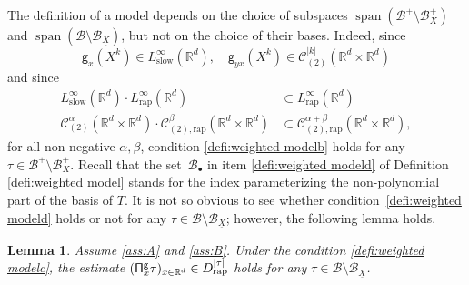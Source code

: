 \documentclass[JEP,XML,SOM,Unicode,published]{cedram}
\newcommand{\sbullet}{{\scriptscriptstyle\bullet}}
\DeclareMathOperator{\Span}{span}
\theoremstyle{plain}
\newtheorem{lem}[thm]{Lemma}
\theoremstyle{definition}
\newcommand{\rap}{\mathrm{rap}}
\newcommand{\slow}{\mathrm{slow}}
\newcommand{\sfg}{\mathsf{g}}
\newcommand{\bbR}{\mathbb{R}}
\newcommand{\mcB}{\mathcal{B}}
\newcommand{\mcC}{\mathcal{C}}
\begin{document}
The definition of a model depends on the choice of subspaces $\Span (\mcB^+\setminus\mcB_X^+)$ and $\Span (\mcB\setminus\mcB_{\underline{X}})$, but not on the choice of their bases.
Indeed, since
\[
\sfg_x(X^k)\in L_\slow^\infty(\bbR^d),\quad \sfg_{yx}(X^k)\in\mcC_{(2)}^{|k|}(\bbR^d\times\bbR^d)
\]
and since
\begin{align*}
L_\slow^\infty(\bbR^d)\cdot L_\rap^\infty(\bbR^d)&\subset L_\rap^\infty(\bbR^d)\\
\tag*{and}\mcC_{(2)}^\alpha(\bbR^d\times\bbR^d)\cdot\mcC_{(2),\rap}^\beta(\bbR^d\times\bbR^d)&\subset\mcC_{(2),\rap}^{\alpha+\beta}(\bbR^d\times\bbR^d),
\end{align*}
for all non-negative $\alpha,\beta$, condition \eqref{defi:weighted modelb} holds for any $\tau\!\in\!\mcB^+\!\setminus\!\mcB_X^+$. Recall that the set~$\mcB_\sbullet$ in item \eqref{defi:weighted modeld} of Definition \ref{defi:weighted model} stands for the index parameterizing the non-polynomial part of the basis of $T$. It is not so obvious to see whether condition~\eqref{defi:weighted modeld} holds or not for any $\tau\in\mcB\setminus\mcB_{\underline{X}}$; however, the following lemma holds.

\skpt
\begin{lem}
Assume \eqref{ass:A} and \eqref{ass:B}.
Under the condition \eqref{defi:weighted modelc}, the estimate $({\sf\Pi}_x^{\sfg}\tau)_{x\in\bbR^d}\in D_{\rap}^{|\tau|}$ holds for any $\tau\in\mcB\setminus\mcB_{\underline{X}}$.
\end{lem}
\end{document}
